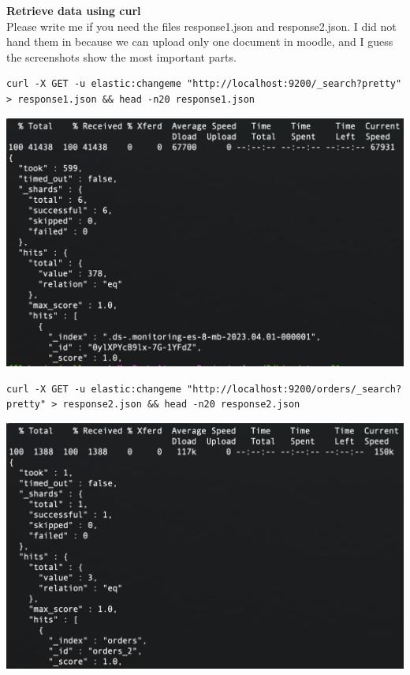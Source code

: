 \documentclass[14pt,a4paper]{extarticle}
\begin{document}
	\noindent \textbf{Retrieve data using curl} \\
	Please write me if you need the files response1.json and response2.json.
	I did not hand them in because we can upload only one document in moodle, and I guess the screenshots show the most important parts.
	\begin{lstlisting}[style=fish]
curl -X GET -u elastic:changeme "http://localhost:9200/_search?pretty" > response1.json && head -n20 response1.json
	\end{lstlisting}
	\includegraphics[height=0.32\textheight]{images/sc14.png}

	\begin{lstlisting}[style=fish]
curl -X GET -u elastic:changeme "http://localhost:9200/orders/_search?pretty" > response2.json && head -n20 response2.json
	\end{lstlisting}
	\includegraphics[height=0.32\textheight]{images/sc15.png}

	\newpage
\end{document}
